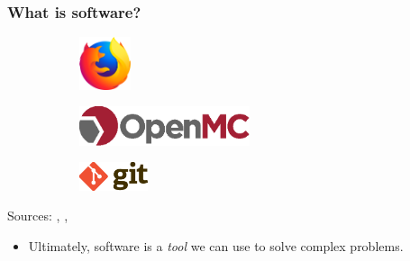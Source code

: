 \begin{frame}
  \frametitle{What is software?}
  \begin{figure}[htpb]
      \centering
      \begin{subfigure}
        \centering
        \includegraphics[width=1.5cm]{images/firefox-logo.eps}
      \end{subfigure}
      \begin{subfigure}
        \centering
        \includegraphics[width=5cm]{images/openmc-logo.eps}
      \end{subfigure}
      \begin{subfigure}
        \centering
        \includegraphics[width=2cm]{images/git-logo.eps}
      \end{subfigure}
  \end{figure}
  \begin{center}
    {\tiny Sources: \cite{firefox_logo}, \cite{openmc_logo}, \cite{git_logo}}
  \end{center}
  \pause\medskip
  \begin{itemize}
      \item Ultimately, software is a {\it tool} we can use to solve complex problems.
  \end{itemize}
\end{frame}

